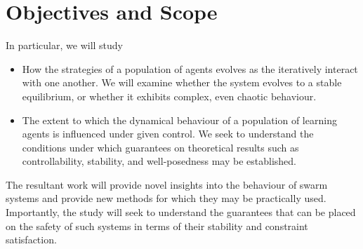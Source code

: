 \documentclass[.../main.tex]{subfiles}
\begin{document}
    \section{Objectives and Scope} \label{sec::Objectives_and_Scope}

    In particular, we will study

    \begin{itemize}
    	\item How the strategies of a population of agents evolves as the iteratively interact
    	with one another. We will examine whether the system evolves to a stable equilibrium, or
    	whether it exhibits complex, even chaotic behaviour.
    	\item The extent to which the dynamical behaviour of a population of learning agents is
    	influenced under given control. We seek to understand the conditions under which guarantees
    	on theoretical results such as controllability, stability, and well-posedness may be
    	established.
    \end{itemize}

    The resultant work will provide novel insights into the behaviour of swarm systems and provide
    new methods for which they may be practically used. Importantly, the study will seek to
    understand the guarantees that can be placed on the safety of such systems in terms of their
    stability and constraint satisfaction.


\end{document}

